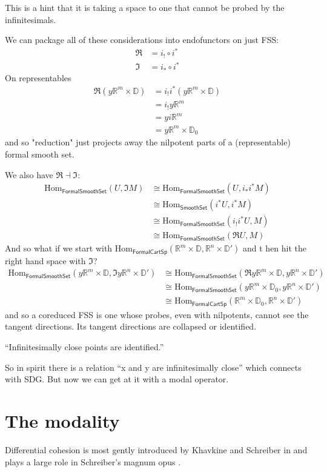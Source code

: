 \documentclass[12pt]{article}
\newcommand{\Hom}{\mathrm{Hom}}
\newcommand{\adj}{\dashv}
\newcommand{\rrn}{\ensuremath{\mathbb{R}^n}}
\newcommand{\rrm}{\ensuremath{\mathbb{R}^m}}
\newcommand{\dd}{\ensuremath{\mathbb{D}}}
\newcommand{\formalcart}{\textsf{FormalCartSp}}
\newcommand{\formalsmoothset}{\textsf{FormalSmoothSet}}
\newcommand{\smoothset}{\textsf{SmoothSet}}
\newcommand{\rmodal}{\Re}
\newcommand{\imodal}{\Im}
\begin{document}
This is a hint that it is taking a space to one that cannot be probed by the infinitesimals.

We can package all of these considerations into endofunctors on just FSS:
\begin{align*}
\rmodal &= i_!\circ i^* \\
\imodal &= i_*\circ i^*
\end{align*}
On representables
\begin{align*}
\rmodal(y\rrm\times\dd) &= i_!i^*(y\rrm\times\dd) \\
&= i_!y\rrm \\
&= yi\rrm \\
&= y\rrm\times\dd_0
\end{align*}
and so "reduction" just projects away the nilpotent parts of a (representable) formal smooth set.

We also have $\rmodal\adj\imodal$:
\begin{align*}
\Hom_{\formalsmoothset}(U, \imodal M)&\cong\Hom_{\formalsmoothset}(U,i_* i^*M) \\
&\cong \Hom_{\smoothset}(i^*U, i^*M) \\
&\cong \Hom_{\formalsmoothset}(i_!i^*U, M) \\
&\cong \Hom_{\formalsmoothset}(\rmodal U, M)
\end{align*}
And so what if we start with $\Hom_{\formalcart}(\rrm\times\dd, \rrn\times\dd')$ and t hen hit the right hand space with $\imodal$?
\begin{align*}
\Hom_{\formalsmoothset}(y\rrm\times\dd, \imodal y\rrn\times\dd') &\cong \Hom_{\formalsmoothset}(\rmodal y\rrm\times\dd, y\rrn\times\dd') \\
&\cong \Hom_{\formalsmoothset}(y\rrm\times\dd_0, y\rrn\times\dd') \\
&\cong \Hom_{\formalcart}(\rrm\times\dd_0, \rrn\times\dd')
\end{align*}
and so a coreduced FSS is one whose probes, even with nilpotents, cannot see the tangent directions. Its tangent directions are collapsed or identified.

“Infinitesimally close points are identified.”

So in spirit there is a relation “x and y are infinitesimally close” which connects with SDG. But now we can get at it with a modal operator.



\section{The modality}\label{sec:modality}
Differential cohesion is most gently introduced by Khavkine and Schreiber in \cite{khavkine_synthetic_2017} and plays a large role in Schreiber's magnum opus \cite{schreiber_differential_2013}.
\end{document}
